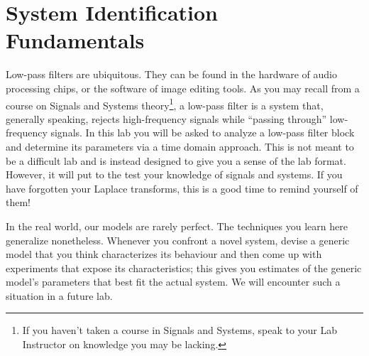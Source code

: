 \chapter{System Identification Fundamentals}\label{Lab:1}
Low-pass filters are ubiquitous. They can be found in the hardware of
audio processing chips, or the software of image editing tools. As you may
recall from a course on Signals and Systems theory\footnote{If you haven't
taken a course in Signals and Systems, speak to your Lab Instructor on
knowledge you may be lacking.}, a low-pass filter
is a system that, generally speaking, rejects high-frequency signals while
``passing through'' low-frequency signals. In this lab you will be asked
to analyze a low-pass filter block and determine its parameters via a time
domain approach. This is not meant to be a difficult lab and is instead
designed to give you a sense of the lab format. However, it will put to the
test your knowledge of signals and systems. If you have forgotten your
Laplace transforms, this is a good time to remind yourself of them!

In the real world, our models are rarely perfect. The techniques
you learn here generalize nonetheless. Whenever you confront a novel system,
devise a generic model that you think characterizes its behaviour and then
come up with experiments that expose its characteristics; this gives you
estimates of the generic model's parameters that best fit the actual system.
We will encounter such a situation in a future lab.

